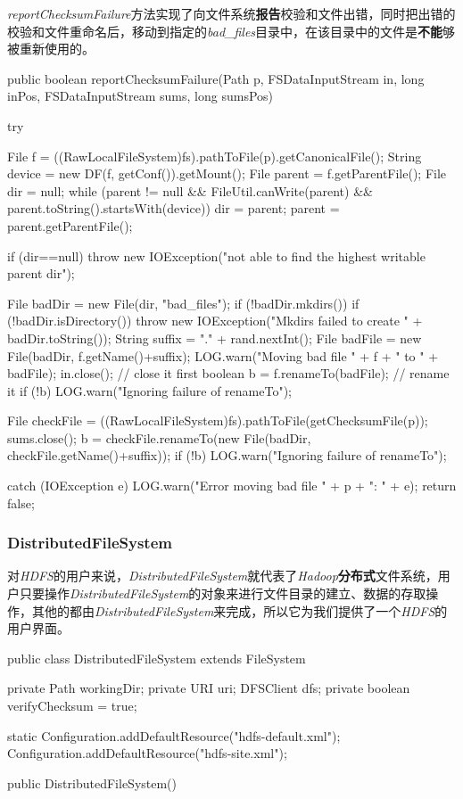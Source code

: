         \textit{reportChecksumFailure}方法实现了向文件系统\textbf{报告}校验和文件出错，同时把出错的校验和文件重命名后，移动到指定的\textit{bad\_files}目录中，在该目录中的文件是\textbf{不能}够被重新使用的。\\
        \begin{java}[caption=reportChecksumFailure]
public boolean reportChecksumFailure(Path p, FSDataInputStream in, long inPos, FSDataInputStream sums, long sumsPos) {
    try {
        File f = ((RawLocalFileSystem)fs).pathToFile(p).getCanonicalFile();
        String device = new DF(f, getConf()).getMount();
        File parent = f.getParentFile();
        File dir = null;
        while (parent != null && FileUtil.canWrite(parent) && parent.toString().startsWith(device)) {
            dir = parent;
            parent = parent.getParentFile();
        }

        if (dir==null) {
            throw new IOException("not able to find the highest writable parent dir");
        }
            
        File badDir = new File(dir, "bad_files");
        if (!badDir.mkdirs()) {
            if (!badDir.isDirectory()) {
            throw new IOException("Mkdirs failed to create " + badDir.toString());
            }
        }
        String suffix = "." + rand.nextInt();
        File badFile = new File(badDir, f.getName()+suffix);
        LOG.warn("Moving bad file " + f + " to " + badFile);
        in.close();    // close it first
        boolean b = f.renameTo(badFile);  // rename it
        if (!b) {
            LOG.warn("Ignoring failure of renameTo");
        }

        File checkFile = ((RawLocalFileSystem)fs).pathToFile(getChecksumFile(p));
        sums.close();
        b = checkFile.renameTo(new File(badDir, checkFile.getName()+suffix));
        if (!b) {
            LOG.warn("Ignoring failure of renameTo");
            }
    } catch (IOException e) {
        LOG.warn("Error moving bad file " + p + ": " + e);
    }
    return false;
}
        \end{java}

    \subsubsection{DistributedFileSystem}
        对\textit{HDFS}的用户来说，\textit{DistributedFileSystem}就代表了\textit{Hadoop}\textbf{分布式}文件系统，用户只要操作\textit{DistributedFileSystem}的对象来进行文件目录的建立、数据的存取操作，其他的都由\textit{DistributedFileSystem}来完成，所以它为我们提供了一个\textit{HDFS}的用户界面。
        \begin{java}[caption=DistributedFileSystem]
public class DistributedFileSystem extends FileSystem {  
    private Path workingDir;  
    private URI uri;  
    DFSClient dfs;  
    private boolean verifyChecksum = true;  
        
    static{  
        Configuration.addDefaultResource("hdfs-default.xml");  
        Configuration.addDefaultResource("hdfs-site.xml");  
    }  
    
    public DistributedFileSystem() {  
    }  
}  
        \end{java}

